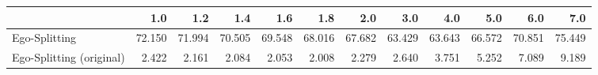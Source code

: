 \begin{tabular}{lrrrrrrrrrrr}
\toprule
{} &    1.0 &    1.2 &    1.4 &    1.6 &    1.8 &    2.0 &    3.0 &    4.0 &    5.0 &    6.0 &    7.0 \\
\midrule
Ego-Splitting            & 72.150 & 71.994 & 70.505 & 69.548 & 68.016 & 67.682 & 63.429 & 63.643 & 66.572 & 70.851 & 75.449 \\
Ego-Splitting (original) &  2.422 &  2.161 &  2.084 &  2.053 &  2.008 &  2.279 &  2.640 &  3.751 &  5.252 &  7.089 &  9.189 \\
\bottomrule
\end{tabular}
